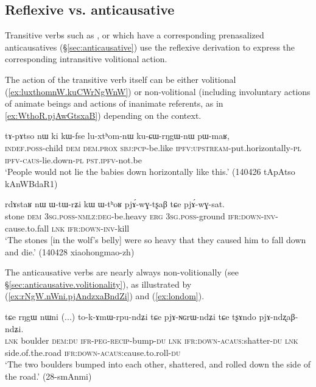  \subsection{Reflexive vs. anticausative}  \label{sec:refl.acaus}
 
Transitive verbs such as ,  or  which have a corresponding  prenasalized anticausatives (§\ref{sec:anticausative}) use the reflexive derivation to express the corresponding intransitive volitional action. 
 
The action of the transitive verb itself can be either volitional (\ref{ex:luxthomnW.kuCWrNgWnW})  or non-volitional (including involuntary actions of animate beings and actions of inanimate referents, as in \ref{ex:WthoR.pjAwGtsxaB}) depending on the context.
 
 \begin{exe}
\ex \label{ex:luxthomnW.kuCWrNgWnW}
 \gll  tɤ-pɤtso nɯ ki kɯ-fse lu-xtʰom-nɯ ku-ɕɯ-rŋgɯ-nɯ pɯ-maʁ, \\
 \textsc{indef}.\textsc{poss}-child \textsc{dem} \textsc{dem}.\textsc{prox} \textsc{sbj}:\textsc{pcp}-be.like \textsc{ipfv}:\textsc{upstream}-put.horizontally-\textsc{pl} \textsc{ipfv}-\textsc{caus}-lie.down-\textsc{pl} \textsc{pst}.\textsc{ipfv}-not.be \\
\glt `People would not lie the babies down horizontally like this.' (140426 tApAtso kAnWBdaR1)
\end{exe}

 \begin{exe}
\ex \label{ex:WthoR.pjAwGtsxaB}
 \gll  rdɤstaʁ nɯ ɯ-tɯ-rʑi kɯ ɯ-tʰoʁ pjɤ́-wɣ-tʂaβ tɕe pjɤ́-wɣ-sat. \\
 stone \textsc{dem} \textsc{3sg}.\textsc{poss}-\textsc{nmlz}:\textsc{deg}-be.heavy \textsc{erg} \textsc{3sg}.\textsc{poss}-ground \textsc{ifr}:\textsc{down}-\textsc{inv}-cause.to.fall \textsc{lnk} \textsc{ifr}:\textsc{down}-\textsc{inv}-kill \\
\glt `The stones [in the wolf's belly] were so heavy that they caused him to fall down and die.' (140428 xiaohongmao-zh)
 \end{exe}
 
 The anticausative verbs are nearly always non-volitionally (see §\ref{sec:anticausative.volitionality}), as illustrated by (\ref{ex:rNgW.nWni.pjAndzxaBndZi}) and (\ref{ex:londom}). 
 
 \begin{exe}
\ex \label{ex:rNgW.nWni.pjAndzxaBndZi}
\gll tɕe rŋgɯ nɯni (...) to-k-ɤmɯ-rpu-ndʑi tɕe pjɤ-ɴɢrɯ-ndʑi tɕe tʂɤndo pjɤ-ndʐaβ-ndʑi. \\
\textsc{lnk} boulder \textsc{dem}:\textsc{du} {  } \textsc{ifr}-\textsc{peg}-\textsc{recip}-bump-\textsc{du} \textsc{lnk} \textsc{ifr}:\textsc{down}-\textsc{acaus}:shatter-\textsc{du} \textsc{lnk} side.of.the.road \textsc{ifr}:\textsc{down}-\textsc{acaus}:cause.to.roll-\textsc{du} \\
\glt `The two boulders bumped into each other, shattered, and rolled down the side of the road.' (28-smAnmi) 	
 \end{exe}

